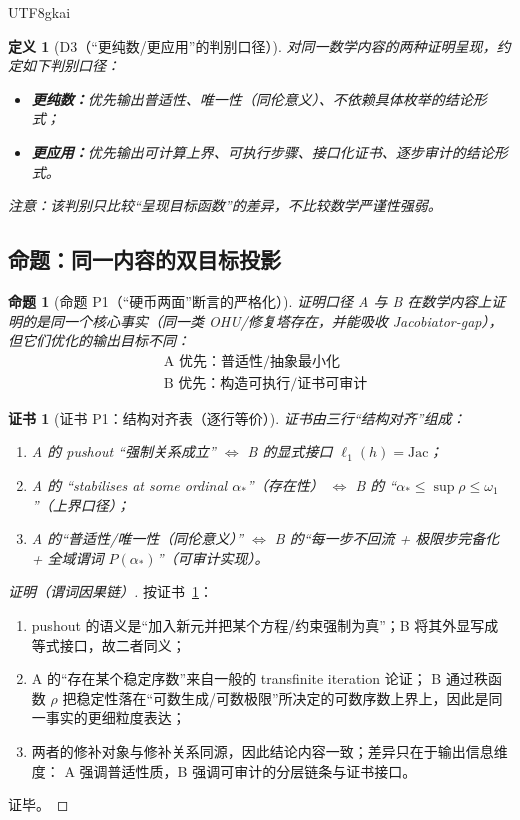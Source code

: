 \documentclass[12pt]{article}
\newtheorem{definition}{定义}[section]
\newtheorem{proposition}{命题}[section]
\newtheorem{Certificate}{证书}[section]
\begin{document}
\begin{CJK*}{UTF8}{gkai}
\begin{definition}[D3（“更纯数/更应用”的判别口径）]
\label{def:tex27-ch27-d3}
对同一数学内容的两种证明呈现，约定如下判别口径：
\begin{itemize}
  \item \textbf{更纯数：}优先输出普适性、唯一性（同伦意义）、不依赖具体枚举的结论形式；
  \item \textbf{更应用：}优先输出可计算上界、可执行步骤、接口化证书、逐步审计的结论形式。
\end{itemize}
注意：该判别只比较“呈现目标函数”的差异，不比较数学严谨性强弱。
\end{definition}

\subsection{命题：同一内容的双目标投影}
\label{subsec:tex27-ch27-prop}

\begin{proposition}[命题 P1（“硬币两面”断言的严格化）]
\label{prop:tex27-ch27-p1}
证明口径 A 与 B 在数学内容上证明的是同一个核心事实（同一类 OHU/修复塔存在，并能吸收 Jacobiator-gap），
但它们优化的输出目标不同：
\[
  \boxed{\begin{aligned}
    &\text{A 优先：普适性/抽象最小化}\\
    &\text{B 优先：构造可执行/证书可审计}
  \end{aligned}}
\]
\end{proposition}

\begin{Certificate}[证书 P1：结构对齐表（逐行等价）]
\label{cert:tex27-ch27-p1}
证书由三行“结构对齐”组成：
\begin{enumerate}
  \item A 的 pushout “强制关系成立”
  $\Longleftrightarrow$
  B 的显式接口 $\ell_1(h)=\mathrm{Jac}$；
  \item A 的 “stabilises at some ordinal $\alpha_\ast$”（存在性）
  $\Longleftrightarrow$
  B 的 “$\alpha_\ast\le \sup\rho\le\omega_1$”（上界口径）；
  \item A 的“普适性/唯一性（同伦意义）”
  $\Longleftrightarrow$
  B 的“每一步不回流 + 极限步完备化 + 全域谓词 $P(\alpha_\ast)$”（可审计实现）。
\end{enumerate}
\end{Certificate}

\begin{proof}[证明（谓词因果链）]
按证书~\ref{cert:tex27-ch27-p1}：
\begin{enumerate}
  \item pushout 的语义是“加入新元并把某个方程/约束强制为真”；B 将其外显写成等式接口，故二者同义；
  \item A 的“存在某个稳定序数”来自一般的 transfinite iteration 论证；
  B 通过秩函数 $\rho$ 把稳定性落在“可数生成/可数极限”所决定的可数序数上界上，因此是同一事实的更细粒度表达；
  \item 两者的修补对象与修补关系同源，因此结论内容一致；差异只在于输出信息维度：
  A 强调普适性质，B 强调可审计的分层链条与证书接口。
\end{enumerate}
证毕。
\end{proof}


\end{CJK*}
\end{document}
